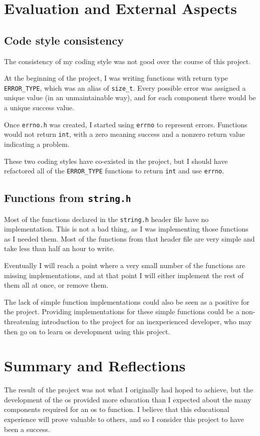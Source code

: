 \documentclass{article}
\begin{document}
\section{Evaluation and External Aspects}
\subsection{Code style consistency}
The consistency of my coding style was not good over the course of this
project.

At the beginning of the project, I was writing functions with return
type \verb!ERROR_TYPE!, which was an alias of \verb!size_t!. Every possible
error was assigned a unique value (in an unmaintainable way), and for each
component there would be a unique success value.

Once \texttt{errno.h} was created, I started using \texttt{errno} to represent
errors. Functions would not return \texttt{int}, with a zero meaning success
and a nonzero return value indicating a problem.

These two coding styles have co-existed in the project, but I should have
refactored all of the \verb!ERROR_TYPE! functions to return \texttt{int} and
use \texttt{errno}.

\subsection{Functions from \texttt{string.h}}
Most of the functions declared in the \texttt{string.h} header file have no
implementation. This is not a bad thing, as I was implementing those functions
as I needed them. Most of the functions from that header file are very simple
and take less than half an hour to write.

Eventually I will reach a point where a very small number of the functions are
missing implementations, and at that point I will either implement the rest of
them all at once, or remove them.

The lack of simple function implementations could also be seen as a positive
for the project. Providing implementations for these simple functions could be
a non-threatening introduction to the project for an inexperienced developer,
who may then go on to learn \gls{os} development using this project.

\section{Summary and Reflections}
The result of the project was not what I originally had hoped to achieve, but
the development of the \gls{os} provided more education than I expected about
the many components required for an \gls{os} to function. I believe that this
educational experience will prove valuable to others, and so I consider this
project to have been a success.
\end{document}
